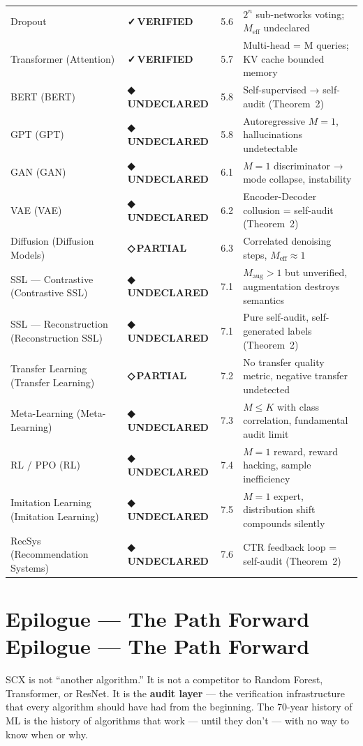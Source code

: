 \documentclass[12pt,a4paper]{article}
\theoremstyle{definition}
\newcommand{\guilty}{{\color{guiltycolor}\textbf{◆\,UNDECLARED}}}
\newcommand{\weakness}{{\color{weakcolor}\textbf{◇\,PARTIAL}}}
\newcommand{\verified}{{\color{verifiedcolor}\textbf{✓\,VERIFIED}}}
\newcommand{\SCX}{\textsc{SCX}}
\begin{document}
\begin{table}[h]
\begin{tabular}{p{3.2cm} p{1.5cm} c p{5.5cm}}
Dropout & \verified{} & 5.6 & $2^n$ sub-networks voting; $M_{\text{eff}}$ undeclared \\
Transformer (Attention) & \verified{} & 5.7 & Multi-head = M queries; KV cache bounded memory \\
BERT (BERT) & \guilty{} & 5.8 & Self-supervised → self-audit (Theorem~2) \\
GPT (GPT) & \guilty{} & 5.8 & Autoregressive $M=1$, hallucinations undetectable \\
GAN (GAN) & \guilty{} & 6.1 & $M=1$ discriminator → mode collapse, instability \\
VAE (VAE) & \guilty{} & 6.2 & Encoder-Decoder collusion = self-audit (Theorem~2) \\
Diffusion (Diffusion Models) & \weakness{} & 6.3 & Correlated denoising steps, $M_{\text{eff}} \approx 1$ \\
SSL — Contrastive (Contrastive SSL) & \guilty{} & 7.1 & $M_{\text{aug}} > 1$ but unverified, augmentation destroys semantics \\
SSL — Reconstruction (Reconstruction SSL) & \guilty{} & 7.1 & Pure self-audit, self-generated labels (Theorem~2) \\
Transfer Learning (Transfer Learning) & \weakness{} & 7.2 & No transfer quality metric, negative transfer undetected \\
Meta-Learning (Meta-Learning) & \guilty{} & 7.3 & $M \le K$ with class correlation, fundamental audit limit \\
RL / PPO (RL) & \guilty{} & 7.4 & $M=1$ reward, reward hacking, sample inefficiency \\
Imitation Learning (Imitation Learning) & \guilty{} & 7.5 & $M=1$ expert, distribution shift compounds silently \\
RecSys (Recommendation Systems) & \guilty{} & 7.6 & CTR feedback loop = self-audit (Theorem~2) \\
\bottomrule
\end{tabular}
\end{table}

\section{Epilogue — The Path Forward Epilogue --- The Path Forward}
\label{sec:epilogue}

\SCX{} is not ``another algorithm.'' It is not a competitor to Random Forest, Transformer, or ResNet. It is the \textbf{audit layer} — the verification infrastructure that every algorithm should have had from the beginning. The 70-year history of ML is the history of algorithms that work — until they don't — with no way to know when or why.
\end{document}
